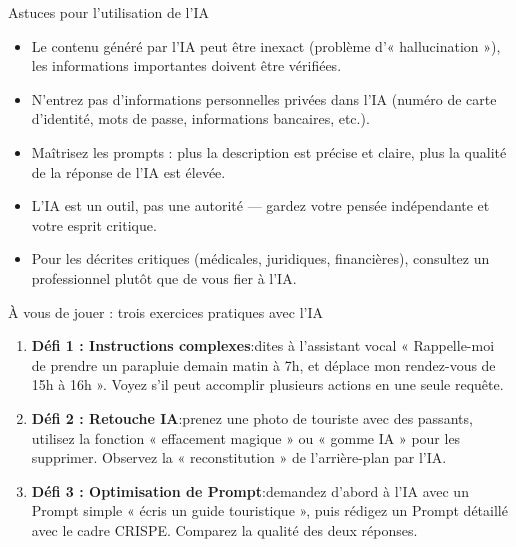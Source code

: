 \begin{tcbinfo}{Astuces pour l'utilisation de l'IA}
\begin{itemize}
  \item Le contenu généré par l'IA peut être inexact (problème d'« hallucination »), les informations importantes doivent être vérifiées.
  \item N'entrez pas d'informations personnelles privées dans l'IA (numéro de carte d'identité, mots de passe, informations bancaires, etc.).
  \item Maîtrisez les prompts : plus la description est précise et claire, plus la qualité de la réponse de l'IA est élevée.
  \item L'IA est un outil, pas une autorité — gardez votre pensée indépendante et votre esprit critique.
  \item Pour les décrites critiques (médicales, juridiques, financières), consultez un professionnel plutôt que de vous fier à l'IA.
\end{itemize}

\end{tcbinfo}

\begin{tcbpractice}{À vous de jouer : trois exercices pratiques avec l'IA}
\begin{enumerate}
  \item \textbf{Défi 1 : Instructions complexes}:dites à l’assistant vocal « Rappelle-moi de prendre un parapluie demain matin à 7h, et déplace mon rendez-vous de 15h à 16h ». Voyez s’il peut accomplir plusieurs actions en une seule requête.
  \item \textbf{Défi 2 : Retouche IA}:prenez une photo de touriste avec des passants, utilisez la fonction « effacement magique » ou « gomme IA » pour les supprimer. Observez la « reconstitution » de l’arrière-plan par l’IA.
  \item \textbf{Défi 3 : Optimisation de Prompt}:demandez d’abord à l’IA avec un Prompt simple « écris un guide touristique », puis rédigez un Prompt détaillé avec le cadre CRISPE. Comparez la qualité des deux réponses.
\end{enumerate}

\end{tcbpractice}

